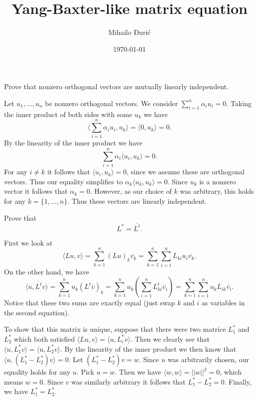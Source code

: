 \documentclass{article}
\title{Yang-Baxter-like matrix equation}
\author{Mihailo Đurić}
\date{\today}
\begin{document}
\maketitle
\newpage

\begin{problem}
  Prove that nonzero orthogonal vectors are mutually linearly independent.
\end{problem}

\begin{solution}
  Let $u_1, \ldots, u_n$ be nonzero orthogonal vectors.
  We consider $\sum_{i=1}^{n} \alpha_i u_i = 0$.
  Taking the inner product of both sides with some $u_k$ we have
  \[\langle \sum_{i=1}^{n} \alpha_i u_i, u_k \rangle = \langle 0, u_k \rangle = 0.\]
  By the linearity of the inner product we have
  \[\sum_{i=1}^{n} \alpha_i \langle u_i, u_k \rangle = 0.\]
  For any $i \neq k$ it follows that $\langle u_i, u_k \rangle = 0$, since we assume these are orthogonal vectors.
  Thus our equality simplifies to $\alpha_k \langle u_k, u_k \rangle = 0$.
  Since $u_k$ is a nonzero vector it follows that $\alpha_k = 0$.
  However, as our choice of $k$ was arbitrary, this holds for any $k = \{1, \ldots, n\}$.
  Thus these vectors are linearly independent.
\end{solution}

\begin{problem}
  Prove that
  \[L^* = \overline{L^t}.\]
\end{problem}

\begin{solution}
  First we look at
  \[\langle Lu, v \rangle = \sum_{k=1}^{n} (Lu)_k \overline{v_k} = \sum_{k=1}^{n} \sum_{i=1}^{n} L_{ki} u_i \overline{v_k}.\]
  On the other hand, we have
  \[\langle u, \overline{L^t} v \rangle = \sum_{k=1}^{n} u_k (L^t \overline{v})_k = \sum_{k=1}^{n} u_k (\sum_{i=1}^{n} L_{ki}^t \overline{v_i}) = \sum_{k=1}^{n} \sum_{i=1}^{n} u_k L_{ik} \overline{v_i}.\]
  Notice that these two sums are exactly equal (just swap $k$ and $i$ as variables in the second equation).

  To show that this matrix is unique, suppose that there were two matrice $L_1^*$ and $L_2^*$ which both satisfied $\langle L u, v \rangle = \langle u, L_i^* v \rangle$.
  Then we clearly see that $\langle u, L_1^* v \rangle = \langle u, L_2^* v \rangle$.
  By the linearity of the inner product we then know that $\langle u, (L_1^* - L_2^*) v \rangle = 0$.
  Let $(L_1^* - L_2^*) v = w$.
  Since $u$ was arbitrarily chosen, our equality holds for any $u$.
  Pick $u = w$.
  Then we have $\langle w, w \rangle = ||w||^2 = 0$, which means $w = 0$.
  Since $v$ was similarly arbitrary it follows that $L_1^* - L_2^* = 0$.
  Finally, we have $L_1^* = L_2^*$.
\end{solution}
\end{document}
